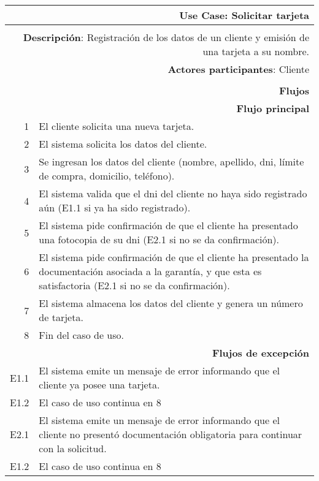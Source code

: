 \begin{tabularx}{\textwidth}{| r | X |}
\hline
\multicolumn{2}{|X|}{
\textbf{Use Case}: Solicitar tarjeta} \\

\hline
\multicolumn{2}{|c|}{\cellcolor[gray]{0.6}} \\

\hline
\multicolumn{2}{|X|}{
\textbf{Descripción}: Registración de los datos de un cliente y emisión de una
tarjeta a su nombre.} \\

\hline
\multicolumn{2}{|X|}{
\textbf{Actores participantes}: Cliente} \\

\hline
\multicolumn{2}{|c|}{\cellcolor[gray]{0.6} } \\

\hline
\multicolumn{2}{|X|}{
\textbf{Flujos}} \\

\hline
\multicolumn{2}{|X|}{
\textbf{Flujo principal}} \\

\hline
1 & El cliente solicita una nueva tarjeta. \\
\hline
2 & El sistema solicita los datos del cliente. \\
\hline
3 & Se ingresan los datos del cliente (nombre, apellido, dni, límite de compra,
domicilio, teléfono). \\
\hline
4 & El sistema valida que el dni del cliente no haya sido registrado aún (E1.1
si ya ha sido registrado). \\
\hline
5 & El sistema pide confirmación de que el cliente ha presentado una fotocopia
de su dni (E2.1 si no se da confirmación). \\
\hline
6 & El sistema pide confirmación de que el cliente ha presentado la
documentación asociada a la garantía, y que esta es satisfactoria (E2.1 si no se
da confirmación). \\
\hline
7 & El sistema almacena los datos del cliente y genera un número de tarjeta. \\
\hline
8 & Fin del caso de uso. \\

\hline
\multicolumn{2}{|X|}{
\textbf{Flujos de excepción}} \\

\hline
E1.1 & El sistema emite un mensaje de error informando que el cliente ya posee
una tarjeta. \\
\hline
E1.2 & El caso de uso continua en 8 \\

\hline
E2.1 & El sistema emite un mensaje de error informando que el cliente no
presentó documentación obligatoria para continuar con la solicitud. \\
\hline
E1.2 & El caso de uso continua en 8 \\

\hline
\end{tabularx}

